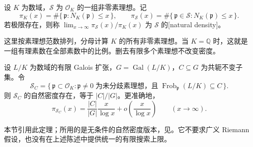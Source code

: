 \begin{definition}\label{b3:def:prime-ideal-natural-density}
	设 \(K\) 为数域，\(\mathcal S\) 为 \(\mathcal O_K\) 的一组非零素理想。记
	\[
		\pi_K(x)=\#\{\,\mathfrak p:N_K(\mathfrak p)\le x\,\},\qquad
		\pi_{\mathcal S}(x)=\#\{\,\mathfrak p\in\mathcal S:N_K(\mathfrak p)\le x\,\}.
	\]
	若极限存在，则称 \(\lim_{x\to\infty}\pi_{\mathcal S}(x)/\pi_K(x)\) 为 \(\mathcal S\) 的[natural density]。
\end{definition}

这里按素理想范数排列，分母计算 \(K\) 的所有非零素理想。当 \(K=\mathbb Q\) 时，这就是一组有理素数在全部素数中的比例。删去有限多个素理想不改变密度。

\begin{theorem}\label{b3:thm:chebotarev-density}
	设 \(L/K\) 为数域的有限 Galois 扩张，\(G=\operatorname{Gal}(L/K)\)，\(C\subseteq G\) 为共轭不变子集。令
	\[
		\mathcal S_C=\{\,\mathfrak p\subset\mathcal O_K:
		\mathfrak p\ne0\;\text{为未分歧素理想，且}\;
		\operatorname{Frob}_{\mathfrak p}(L/K)\subseteq C\,\}.
	\]
	则 \(\mathcal S_C\) 的自然密度存在，等于 \(|C|/|G|\)。更准确地，
	\[
		\pi_{\mathcal S_C}(x)
		=\dfrac{|C|}{|G|}\dfrac{x}{\log x}
		+o\!\left(\dfrac{x}{\log x}\right)
		\qquad(x\to\infty).
	\]
\end{theorem}

本节引用此定理；所用的是无条件的自然密度版本，见\cite[Section 2.1, Théorème 1, p. 131]{Serre1981ChebotarevApplications}。它不要求广义 Riemann 假设，也没有在上述陈述中提供统一的有限搜索上限。

